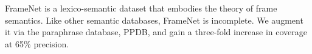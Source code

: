 FrameNet is a lexico-semantic dataset that embodies the theory of frame semantics. Like other semantic databases, FrameNet is incomplete. We augment it via the paraphrase database, PPDB, and gain a three-fold increase in coverage at 65\% precision.
